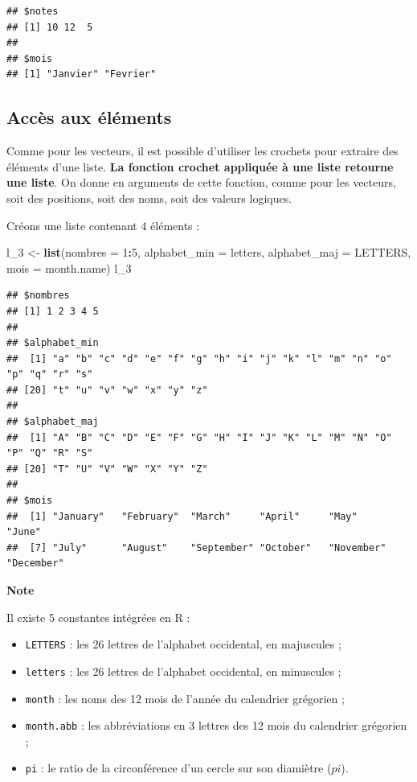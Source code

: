 \documentclass[
  11pt,
]{book}
\newenvironment{Shaded}{\begin{snugshade}}{\end{snugshade}}
\newcommand{\AttributeTok}[1]{\textcolor[rgb]{0.13,0.29,0.53}{#1}}
\newcommand{\DecValTok}[1]{\textcolor[rgb]{0.00,0.00,0.81}{#1}}
\newcommand{\FunctionTok}[1]{\textcolor[rgb]{0.13,0.29,0.53}{\textbf{#1}}}
\newcommand{\NormalTok}[1]{#1}
\newcommand{\OtherTok}[1]{\textcolor[rgb]{0.56,0.35,0.01}{#1}}
\newcommand{\SpecialCharTok}[1]{\textcolor[rgb]{0.81,0.36,0.00}{\textbf{#1}}}
\providecommand{\tightlist}{%
  \setlength{\itemsep}{0pt}\setlength{\parskip}{0pt}}
\numberwithin{equation}{section}
\numberwithin{countremarque}{section}
\newenvironment{notebox}{
  \begin{tcolorbox}[breakable, colback=jaune,coltext=black,
                  colframe=grisfonce]}
 {\end{tcolorbox}}
\begin{document}
\begin{lstlisting}
## $notes
## [1] 10 12  5
## 
## $mois
## [1] "Janvier" "Fevrier"
\end{lstlisting}

\hypertarget{accuxe8s-aux-uxe9luxe9ments}{%
\subsection{Accès aux éléments}\label{accuxe8s-aux-uxe9luxe9ments}}

Comme pour les vecteurs, il est possible d'utiliser les crochets pour extraire des éléments d'une liste. \textbf{La fonction crochet appliquée à une liste retourne une liste}. On donne en arguments de cette fonction, comme pour les vecteurs, soit des positions, soit des noms, soit des valeurs logiques.

Créons une liste contenant 4 éléments :

\begin{Shaded}
\begin{Highlighting}[]
\NormalTok{l\_3 }\OtherTok{\textless{}{-}} \FunctionTok{list}\NormalTok{(}\AttributeTok{nombres =} \DecValTok{1}\SpecialCharTok{:}\DecValTok{5}\NormalTok{, }\AttributeTok{alphabet\_min =}\NormalTok{ letters,}
            \AttributeTok{alphabet\_maj =}\NormalTok{ LETTERS, }\AttributeTok{mois =}\NormalTok{ month.name)}
\NormalTok{l\_3}
\end{Highlighting}
\end{Shaded}

\begin{lstlisting}
## $nombres
## [1] 1 2 3 4 5
## 
## $alphabet_min
##  [1] "a" "b" "c" "d" "e" "f" "g" "h" "i" "j" "k" "l" "m" "n" "o" "p" "q" "r" "s"
## [20] "t" "u" "v" "w" "x" "y" "z"
## 
## $alphabet_maj
##  [1] "A" "B" "C" "D" "E" "F" "G" "H" "I" "J" "K" "L" "M" "N" "O" "P" "Q" "R" "S"
## [20] "T" "U" "V" "W" "X" "Y" "Z"
## 
## $mois
##  [1] "January"   "February"  "March"     "April"     "May"       "June"     
##  [7] "July"      "August"    "September" "October"   "November"  "December"
\end{lstlisting}

\begin{notebox}

\textbf{Note}

Il existe 5 constantes intégrées en R :

\begin{itemize}
\tightlist
\item
  \texttt{LETTERS} : les 26 lettres de l'alphabet occidental, en majuscules ;
\item
  \texttt{letters} : les 26 lettres de l'alphabet occidental, en minuscules ;
\item
  \texttt{month} : les noms des 12 mois de l'année du calendrier grégorien ;
\item
  \texttt{month.abb} : les abbréviations en 3 lettres des 12 mois du calendrier grégorien ;
\item
  \texttt{pi} : le ratio de la circonférence d'un cercle sur son diamiètre (\(pi\)).
\end{itemize}

\end{notebox}
\end{document}

